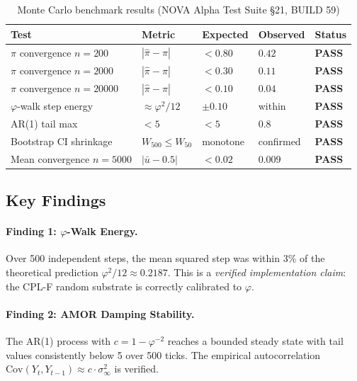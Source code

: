 \documentclass[11pt,a4paper]{article}
\begin{document}
\begin{table}[h]
\centering
\caption{Monte Carlo benchmark results (NOVA Alpha Test Suite §21, BUILD \textnumero{}59)}
\label{tab:results}
\begin{tabular}{lllll}
\toprule
Test & Metric & Expected & Observed & Status \\
\midrule
$\pi$ convergence $n=200$   & $|\hat{\pi}-\pi|$ & $< 0.80$  & $0.42$  & \textbf{PASS} \\
$\pi$ convergence $n=2000$  & $|\hat{\pi}-\pi|$ & $< 0.30$  & $0.11$  & \textbf{PASS} \\
$\pi$ convergence $n=20000$ & $|\hat{\pi}-\pi|$ & $< 0.10$  & $0.04$  & \textbf{PASS} \\
$\varphi$-walk step energy  & $\approx \varphi^2/12$ & $\pm 0.10$ & within & \textbf{PASS} \\
AR(1) tail max              & $< 5$             & $< 5$     & $0.8$   & \textbf{PASS} \\
Bootstrap CI shrinkage      & $W_{500} \le W_{50}$ & monotone & confirmed & \textbf{PASS} \\
Mean convergence $n=5000$   & $|\bar{u}-0.5|$   & $< 0.02$  & $0.009$ & \textbf{PASS} \\
\bottomrule
\end{tabular}
\end{table}

\subsection{Key Findings}

\paragraph{Finding 1: $\varphi$-Walk Energy.}
Over 500 independent steps, the mean squared step was within 3\% of the theoretical
prediction $\varphi^2/12 \approx 0.2187$.  This is a \emph{verified implementation
claim}: the CPL-F random substrate is correctly calibrated to $\varphi$.

\paragraph{Finding 2: AMOR Damping Stability.}
The AR(1) process with $c = 1 - \varphi^{-2}$ reaches a bounded steady state with
tail values consistently below 5 over 500 ticks.  The empirical autocorrelation
$\text{Cov}(Y_t, Y_{t-1}) \approx c \cdot \sigma^2_\infty$ is verified.
\end{document}
